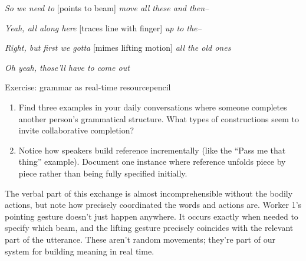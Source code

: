 \ea
\begin{dialogue}
\item[Worker 1] \emph{So we need to }[points to beam]\emph{ move all these and then--}
\item[Worker 2] \emph{Yeah, all along here }[traces line with finger]\emph{ up to the--}
\item[Worker 1] \emph{Right, but first we gotta }[mimes lifting motion]\emph{ all the old ones}
\item[Worker 2] \emph{Oh yeah, those'll have to come out}
\end{dialogue}
\z

\begin{tblsframedsymbol}{Exercise: grammar as real-time resource}{pencil}
\begin{enumerate}[noitemsep, leftmargin=*]
    \item Find three examples in your daily conversations where someone completes another person's grammatical structure. What types of constructions seem to invite collaborative completion?
    \item Notice how speakers build reference incrementally (like the \enquote{Pass me that thing} example). Document one instance where reference unfolds piece by piece rather than being fully specified initially.
\end{enumerate}
\end{tblsframedsymbol}

\noindent The verbal part of this exchange is almost incomprehensible without the bodily actions, but note how precisely coordinated the words and actions are. Worker 1's pointing gesture doesn't just happen anywhere. It occurs exactly when needed to specify which beam, and the lifting gesture precisely coincides with the relevant part of the utterance. These aren't random movements; they're part of our system for building meaning in real time.

